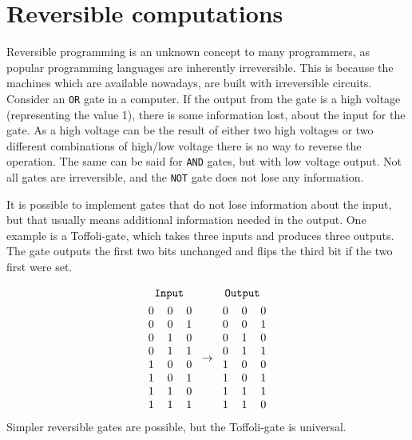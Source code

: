 
\section{Reversible computations}
\label{Reverse}
Reversible programming is an unknown concept to many programmers, as popular programming languages are inherently irreversible. This is because the machines which are available nowadays, are built with irreversible circuits. Consider an \texttt{OR} gate in a computer. If the output from the gate is a high voltage (representing the value 1), there is some information lost, about the input for the gate. As a high voltage can be the result of either two high voltages or two different combinations of high/low voltage there is no way to reverse the operation. The same can be said for \texttt{AND} gates, but with low voltage output. Not all gates are irreversible, and the \texttt{NOT} gate does not lose any information.

It is possible to implement gates that do not lose information about the input, but that usually means additional information needed in the output. One example is a Toffoli-gate\cite{Toffoli}, which takes three inputs and produces three outputs. The gate outputs the first two bits unchanged and flips the third bit if the two first were set.

\begin{gather}
\mathtt{Input}~~~~~~~~~~~\mathtt{Output}\\
\begin{tabular}{lll}
0 & 0 & 0 \\
0 & 0 & 1 \\
0 & 1 & 0 \\
0 & 1 & 1 \\
1 & 0 & 0 \\
1 & 0 & 1 \\
1 & 1 & 0 \\
1 & 1 & 1
\end{tabular}
\rightarrow
\begin{tabular}{lll}
0 & 0 & 0 \\
0 & 0 & 1 \\
0 & 1 & 0 \\
0 & 1 & 1 \\
1 & 0 & 0 \\
1 & 0 & 1 \\
1 & 1 & 1 \\
1 & 1 & 0
\end{tabular}
\end{gather}
Simpler reversible gates are possible, but the Toffoli-gate is universal.

